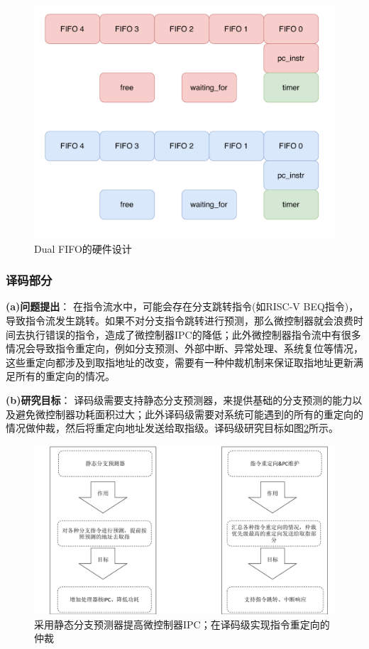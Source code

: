 \documentclass[a4paper, 12pt]{article}
\begin{document}
\begin{figure}[htbp]
  \centering
  \includegraphics[width=0.6\linewidth]{./images/if_dual_fifo.pdf}
  \caption{Dual FIFO的硬件设计}
  \label{fig:if_dual_fifo}
\end{figure}

\subsubsection{译码部分}
\textbf{(a)问题提出}：
在指令流水中，可能会存在分支跳转指令(如RISC-V BEQ指令)，导致指令流发生跳转\cite{al2020hybrid}。如果不对分支指令跳转进行预测，那么微控制器就会浪费时间去执行错误的指令，造成了微控制器IPC的降低\cite{arul2020design}；此外微控制器指令流中有很多情况会导致指令重定向，例如分支预测、外部中断、异常处理、系统复位等情况\cite{benila2022plan}，这些重定向都涉及到取指地址的改变，需要有一种仲裁机制来保证取指地址更新满足所有的重定向的情况\cite{choudhury2022optimized}。

\textbf{(b)研究目标}：
译码级需要支持静态分支预测器，来提供基础的分支预测的能力以及避免微控制器功耗面积过大\cite{park2019branch}；此外译码级需要对系统可能遇到的所有的重定向的情况做仲裁，然后将重定向地址发送给取指级\cite{miyazaki2020rvcorep}。译码级研究目标如图\ref{fig:id_design_features}所示。

\begin{figure}[htbp]
  \centering
  \includegraphics[width=0.8\linewidth]{./images/id_design_features.pdf}
  \caption{采用静态分支预测器提高微控制器IPC；在译码级实现指令重定向的仲裁}
  \label{fig:id_design_features}
\end{figure}
\end{document}
